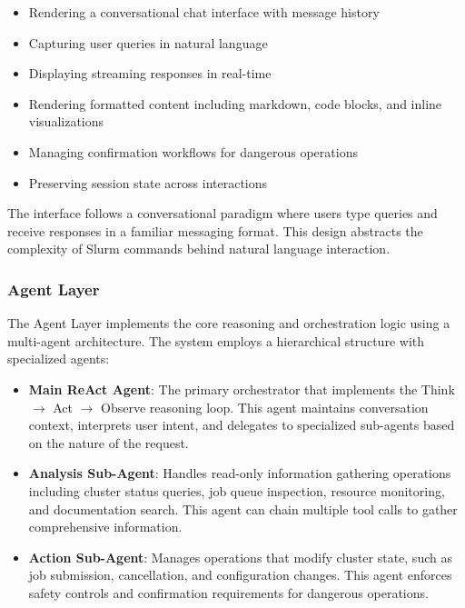 \begin{itemize}
    \item Rendering a conversational chat interface with message history
    \item Capturing user queries in natural language
    \item Displaying streaming responses in real-time
    \item Rendering formatted content including markdown, code blocks, and inline visualizations
    \item Managing confirmation workflows for dangerous operations
    \item Preserving session state across interactions
\end{itemize}

The interface follows a conversational paradigm where users type queries and receive responses in a familiar messaging format. This design abstracts the complexity of Slurm commands behind natural language interaction.

\subsubsection{Agent Layer}

The Agent Layer implements the core reasoning and orchestration logic using a multi-agent architecture. The system employs a hierarchical structure with specialized agents:

\begin{itemize}
    \item \textbf{Main ReAct Agent}: The primary orchestrator that implements the Think $\rightarrow$ Act $\rightarrow$ Observe reasoning loop. This agent maintains conversation context, interprets user intent, and delegates to specialized sub-agents based on the nature of the request.
    
    \item \textbf{Analysis Sub-Agent}: Handles read-only information gathering operations including cluster status queries, job queue inspection, resource monitoring, and documentation search. This agent can chain multiple tool calls to gather comprehensive information.
    
    \item \textbf{Action Sub-Agent}: Manages operations that modify cluster state, such as job submission, cancellation, and configuration changes. This agent enforces safety controls and confirmation requirements for dangerous operations.
\end{itemize}

